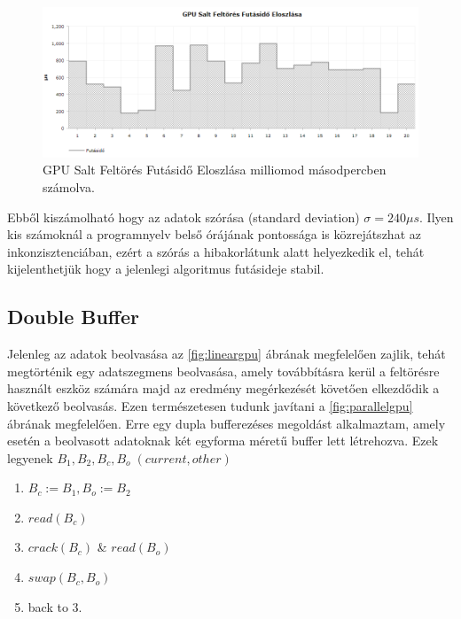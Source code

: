 \begin{figure}[H]
    \centering
    \includegraphics[width=\textwidth]{images/charts/performance-1-distribution.png}
    \caption{GPU Salt Feltörés Futásidő Eloszlása milliomod másodpercben számolva.}
\end{figure}


Ebből kiszámolható hogy az adatok szórása (standard deviation) $\sigma = 240\mu s$. Ilyen kis számoknál a programnyelv belső órájának pontossága is közrejátszhat az inkonzisztenciában, ezért a szórás a hibakorlátunk alatt helyezkedik el, tehát kijelenthetjük hogy a jelenlegi algoritmus futásideje stabil.




\subsection{Double Buffer}



Jelenleg az adatok beolvasása az \ref{fig:lineargpu} ábrának megfelelően zajlik, tehát megtörténik egy adatszegmens beolvasása, amely továbbításra kerül a feltörésre használt eszköz számára majd az eredmény megérkezését követően elkezdődik a következő beolvasás. Ezen természetesen tudunk javítani a  \ref{fig:parallelgpu} ábrának megfelelően. Erre egy dupla bufferezéses megoldást alkalmaztam, amely esetén a beolvasott adatoknak két egyforma méretű buffer lett létrehozva. Ezek legyenek $B_1, B_2, B_c, B_o \; (current, other)$
%
\begin{enumerate}
    \itemsep-0.5em
    \item $ B_c := B_1, B_o := B_2 $
    \item $ read(B_c) $
    \item $ crack(B_c) $ \& $ read(B_o) $
    \item $ swap(B_c, B_o) $
    \item back to 3.
\end{enumerate}

